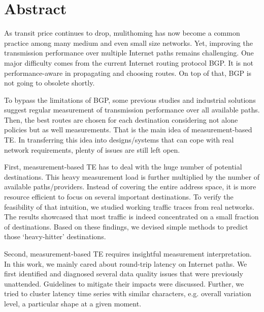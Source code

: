 \begingroup
\let\clearpage\relax
\let\cleardoublepage\relax
\let\cleardoublepage\relax

\chapter*{Abstract}

As transit price continues to drop, mulithoming has now become a common practice among many medium and even small size networks. Yet, improving the transmission performance over multiple Internet paths remains challenging.
One major difficulty comes from the current Internet routing protocol \acf{BGP}.
It is not performance-aware in propagating and choosing routes. 
On top of that, \ac{BGP} is not going to obsolete shortly.

To bypass the limitations of \ac{BGP}, some previous studies and industrial solutions suggest regular measurement of transmission performance over all available paths.
Then, the best routes are chosen for each destination considering not alone policies but as well measurements. That is the main idea of measurement-based \acf{TE}.
In transferring this idea into designs/systems that can cope with real network requirements, plenty of  issues are still left open.

First, measurement-based TE has to deal with the huge number of potential destinations.
This heavy measurement load is further multiplied by the number of available paths/providers.
Instead of covering the entire address space, it is more resource efficient to focus on several important destinations.
To verify the feasibility of that intuition, we studied working traffic traces from real networks.
The results showcased that most traffic is indeed concentrated on a small fraction of destinations.
Based on these findings, we devised simple methods to predict those `heavy-hitter' destinations.

Second, measurement-based TE requires insightful measurement interpretation.
In this work, we mainly cared about round-trip latency on Internet paths.
We first identified and diagnosed several data quality issues that were previously unattended.
Guidelines to mitigate their impacts were discussed.
Further, we tried to cluster latency time series with similar characters, e.g. overall variation level, a particular shape at a given moment.

